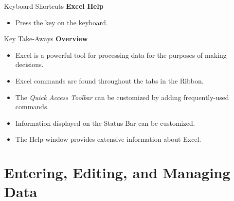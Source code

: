 \begin{center}
	\begin{shtcutbox}{Keyboard Shortcuts}
		\textbf{Excel Help}
		\\
		\begin{itemize}
			\setlength{\itemsep}{0pt}
			\setlength{\parskip}{0pt}
			\setlength{\parsep}{0pt}
			
			\item Press the  key on the keyboard.
			
		\end{itemize}
	\end{shtcutbox}
\end{center}


\begin{center}
	\begin{tkwbox}{Key Take-Aways}
		\textbf{Overview}
		\\
		\begin{itemize}
			\setlength{\itemsep}{0pt}
			\setlength{\parskip}{0pt}
			\setlength{\parsep}{0pt}
			
			\item Excel is a powerful tool for processing data for the purposes of making decisions.
			\item Excel commands are found throughout the tabs in the Ribbon.
			\item The \textit{Quick Access Toolbar} can be customized by adding frequently-used commands.
			\item Information displayed on the Status Bar can be customized.
			\item The Help window provides extensive information about Excel.
			
		\end{itemize}
	\end{tkwbox}
\end{center}

\section{Entering, Editing, and Managing Data}

